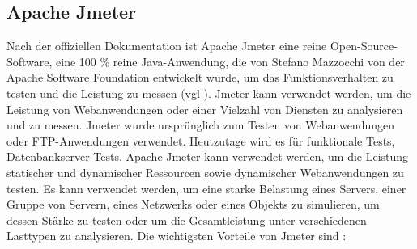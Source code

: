 \subsection{Apache Jmeter}


Nach der offiziellen Dokumentation ist Apache Jmeter eine reine
Open-Source-Software, eine 100 \% reine Java-Anwendung, die von Stefano
Mazzocchi von der Apache Software Foundation entwickelt wurde, um das
Funktionsverhalten zu testen und die Leistung zu messen (vgl \cite{jmeter}). Jmeter kann
verwendet werden, um die Leistung von Webanwendungen oder einer Vielzahl
von Diensten zu analysieren und zu messen. Jmeter wurde ursprünglich zum
Testen von Webanwendungen oder FTP-Anwendungen verwendet. Heutzutage wird
es für funktionale Tests, Datenbankserver-Tests. Apache Jmeter kann
verwendet werden, um die Leistung statischer und dynamischer Ressourcen
sowie dynamischer Webanwendungen zu testen. Es kann verwendet werden, um
eine starke Belastung eines Servers, einer Gruppe von Servern, eines
Netzwerks oder eines Objekts zu simulieren, um dessen Stärke zu testen
oder um die Gesamtleistung unter verschiedenen Lasttypen zu analysieren.
Die wichtigsten Vorteile von Jmeter sind :

